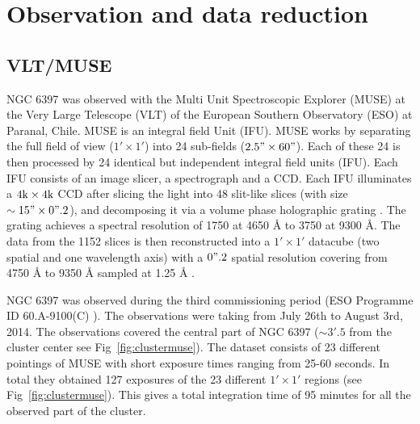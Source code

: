 \chapter{Observation and data reduction}\label{chap:data}
\thispagestyle{fancy}

\section{VLT/MUSE}

NGC 6397 was observed with the Multi Unit Spectroscopic Explorer (MUSE) at the Very Large Telescope (VLT) of the European Southern Observatory (ESO) at Paranal, Chile. MUSE is an integral field Unit (IFU). MUSE works by separating the full field of view ($1' \times 1'$) into 24 sub-fields ($2.5" \times 60"$). Each of these 24 is then processed by 24 identical but independent integral field units (IFU). Each IFU consists of an image slicer, a spectrograph and a CCD. Each IFU illuminates a $4 \text k \times 4 \text k$ CCD after slicing the light into 48 slit-like slices (with size $\sim 15" \times 0".2$), and decomposing it via a volume phase holographic grating \citep{barden_volume-phase_1998}. The grating achieves a spectral resolution of 1750 at 4650 Å to 3750 at 9300 Å. The data from the 1152 slices is then reconstructed into a $1' \times 1'$ datacube (two spatial and one wavelength axis) with a $0".2$ spatial resolution covering from 4750 Å to 9350 Å sampled at 1.25 Å \citep{bacon_muse_2010}. 

NGC 6397 was observed during the third commissioning period  (ESO Programme ID 60.A-9100(C) \cite{bacon_muse_2014}). The observations were taking from July 26th to August 3rd, 2014. The observations covered the central part of NGC 6397 ($\sim 3'.5$ from the cluster center see Fig~\ref{fig:clustermuse}). The dataset consists of 23 different pointings of MUSE with short exposure times ranging from 25-60 seconds. In total they obtained 127 exposures of the 23 different $1' \times 1'$ regions (see Fig~\ref{fig:clustermuse}). This gives a total integration time of 95 minutes for all the observed part of the cluster.



